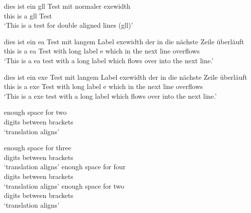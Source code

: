 \newpage 
\ea
 \gll dies ist ein gll Test mit normaler exewidth\\
      this is a gll Test\\
 \glt `This is a test for double aligned lines (gll)'
\z

\setcounter{xnumi}{123}
\setcounter{equation}{123}

\ea
 \gll dies ist ein ea Test mit langem Label exewidth der in die nächste Zeile überläuft\\
      this is a ea Test with long label e which in the next line overflows\\
 \glt `This is a ea test with a long label which flows over into the next line.'
\z

\begin{exe}
 \ex
 \gll dies ist ein exe Test mit langem Label exewidth der in die nächste Zeile überläuft\\
      this is a exe Test with long label e which in the next line overflows\\
 \glt `This is a exe test with a long label which flows over into the next line.' 
\end{exe}

\twodigitexamples
\ea
\gll enough space for two\\
digits between brackets\\
\glt `translation aligns'
\z
 

\threedigitexamples
\ea 
\gll enough space for three\\
digits between brackets\\
\glt `translation aligns'
\z
\fourdigitexamples
\ea
\gll enough space for four\\
digits between brackets\\
\glt `translation aligns'
\z
\twodigitexamples
\ea
\gll enough space for two\\
digits between brackets\\
\glt `translation aligns'
\z

\setcounter{equation}{20} 